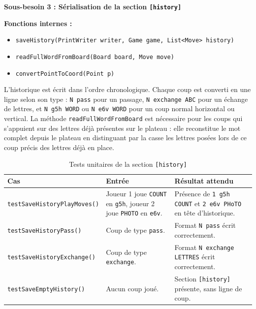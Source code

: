 \documentclass[a4paper]{article}
\begin{document}
\begin{besoinbox}
    \textbf{\large Sous-besoin 3 : Sérialisation de la section \texttt{[history]}}

    \vspace{2mm}
    \textbf{Fonctions internes :}
    \begin{itemize}
        \item \texttt{saveHistory(PrintWriter writer, Game game, List<Move> history)}
        \item \texttt{readFullWordFromBoard(Board board, Move move)}
        \item \texttt{convertPointToCoord(Point p)}
    \end{itemize}
    \vspace{2mm}

    L'historique est écrit dans l'ordre chronologique. Chaque coup est converti en une ligne selon son type : \texttt{N pass} pour un passage, \texttt{N exchange ABC} pour un échange de lettres, et \texttt{N g5h WORD} ou \texttt{N e6v WORD} pour un coup normal horizontal ou vertical. La méthode \texttt{readFullWordFromBoard} est nécessaire pour les coups qui s'appuient sur des lettres déjà présentes sur le plateau : elle reconstitue le mot complet depuis le plateau en distinguant par la casse les lettres posées lors de ce coup précis des lettres déjà en place.
\end{besoinbox}

\begin{table}[H]
    \centering
    \small
    \begin{tabular}{p{4.5cm} p{4.5cm} p{5.5cm}}
        \toprule
        \textbf{Cas} & \textbf{Entrée} & \textbf{Résultat attendu} \\
        \midrule
        \texttt{testSaveHistoryPlayMoves()} & Joueur 1 joue \texttt{COUNT} en \texttt{g5h}, joueur 2 joue \texttt{PHOTO} en \texttt{e6v}. & Présence de \texttt{1 g5h COUNT} et \texttt{2 e6v PHoTO} en tête d'historique. \\
        \midrule
        \texttt{testSaveHistoryPass()} & Coup de type \texttt{pass}. & Format \texttt{N pass} écrit correctement. \\
        \midrule
        \texttt{testSaveHistoryExchange()} & Coup de type \texttt{exchange}. & Format \texttt{N exchange LETTRES} écrit correctement. \\
        \midrule
        \texttt{testSaveEmptyHistory()} & Aucun coup joué. & Section \texttt{[history]} présente, sans ligne de coup. \\
        \bottomrule
    \end{tabular}
    \caption{Tests unitaires de la section \texttt{[history]}}
\end{table}
\end{document}
